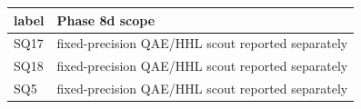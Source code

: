 \begin{tabular}{ll}
\hline
label & Phase 8d scope \\
\hline
SQ17 & fixed-precision QAE/HHL scout reported separately \\
SQ18 & fixed-precision QAE/HHL scout reported separately \\
SQ5 & fixed-precision QAE/HHL scout reported separately \\
\hline
\end{tabular}
